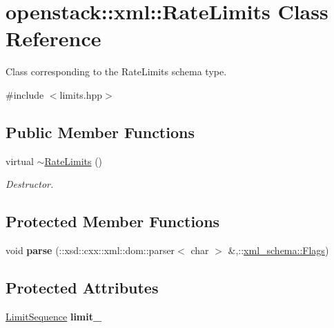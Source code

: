 \hypertarget{classopenstack_1_1xml_1_1RateLimits}{
\section{openstack::xml::RateLimits Class Reference}
\label{classopenstack_1_1xml_1_1RateLimits}
}


Class corresponding to the RateLimits schema type.  




{\ttfamily \#include $<$limits.hpp$>$}

\subsection*{Public Member Functions}
\begin{DoxyCompactItemize}
\item 
\hypertarget{classopenstack_1_1xml_1_1RateLimits_ad9de094479a5eb897d23ddb6893d1382}{
virtual \hyperlink{classopenstack_1_1xml_1_1RateLimits_ad9de094479a5eb897d23ddb6893d1382}{$\sim$RateLimits} ()}
\label{classopenstack_1_1xml_1_1RateLimits_ad9de094479a5eb897d23ddb6893d1382}

\begin{DoxyCompactList}\small\item\em Destructor. \item\end{DoxyCompactList}\end{DoxyCompactItemize}
\subsection*{Protected Member Functions}
\begin{DoxyCompactItemize}
\item 
\hypertarget{classopenstack_1_1xml_1_1RateLimits_a463714f77f16c05232335d7d3e5b20c5}{
void {\bfseries parse} (::xsd::cxx::xml::dom::parser$<$ char $>$ \&,::\hyperlink{namespacexml__schema_affb4c227cbd9aa7453dd1dc5a1401943}{xml\_\-schema::Flags})}
\label{classopenstack_1_1xml_1_1RateLimits_a463714f77f16c05232335d7d3e5b20c5}

\end{DoxyCompactItemize}
\subsection*{Protected Attributes}
\begin{DoxyCompactItemize}
\item 
\hypertarget{classopenstack_1_1xml_1_1RateLimits_ad954f729a708280507415cf40d1835e9}{
\hyperlink{classopenstack_1_1xml_1_1RateLimits_a51412c2aa554f271b6bca7986198bcb9}{LimitSequence} {\bfseries limit\_\-}}
\label{classopenstack_1_1xml_1_1RateLimits_ad954f729a708280507415cf40d1835e9}

\end{DoxyCompactItemize}
